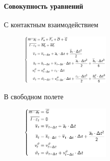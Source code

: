 \documentclass[c]{beamer}  %
\begin{document}
\begin{frame}
\frametitle{\insertsection} 
\framesubtitle{Совокупность уравнений}
С контактным взаимодействием
\begin{figure}[h!]
	\includegraphics[width=0.4\textwidth]{ur_with}
\end{figure} 
В свободном полете
\begin{figure}[h!]
	\centering
	\includegraphics[width=0.4\textwidth]{ur_without}
\end{figure} 


\end{frame}
\end{document}
